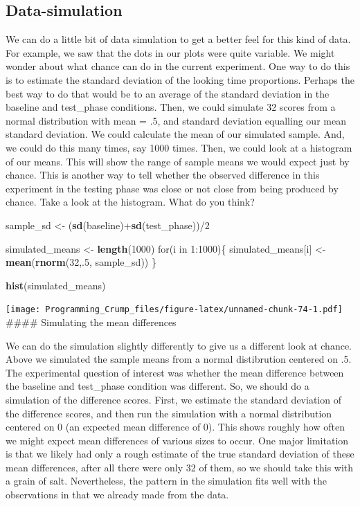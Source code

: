 \documentclass[]{book}
\newenvironment{Shaded}{\begin{snugshade}}{\end{snugshade}}
\newcommand{\KeywordTok}[1]{\textcolor[rgb]{0.13,0.29,0.53}{\textbf{{#1}}}}
\newcommand{\DecValTok}[1]{\textcolor[rgb]{0.00,0.00,0.81}{{#1}}}
\newcommand{\StringTok}[1]{\textcolor[rgb]{0.31,0.60,0.02}{{#1}}}
\newcommand{\NormalTok}[1]{{#1}}
\theoremstyle{definition}
\theoremstyle{definition}
\theoremstyle{definition}
\theoremstyle{remark}
\begin{document}
\subsection{Data-simulation}\label{data-simulation}

We can do a little bit of data simulation to get a better feel for this
kind of data. For example, we saw that the dots in our plots were quite
variable. We might wonder about what chance can do in the current
experiment. One way to do this is to estimate the standard deviation of
the looking time proportions. Perhaps the best way to do that would be
to an average of the standard deviation in the baseline and test\_phase
conditions. Then, we could simulate 32 scores from a normal distribution
with mean = .5, and standard deviation equalling our mean standard
deviation. We could calculate the mean of our simulated sample. And, we
could do this many times, say 1000 times. Then, we could look at a
histogram of our means. This will show the range of sample means we
would expect just by chance. This is another way to tell whether the
observed difference in this experiment in the testing phase was close or
not close from being produced by chance. Take a look at the histogram.
What do you think?

\begin{Shaded}
\begin{Highlighting}[]
\NormalTok{sample_sd   <-}\StringTok{ }\NormalTok{(}\KeywordTok{sd}\NormalTok{(baseline)+}\KeywordTok{sd}\NormalTok{(test_phase))/}\DecValTok{2}

\NormalTok{simulated_means <-}\StringTok{ }\KeywordTok{length}\NormalTok{(}\DecValTok{1000}\NormalTok{)}
\NormalTok{for(i in }\DecValTok{1}\NormalTok{:}\DecValTok{1000}\NormalTok{)\{}
 \NormalTok{simulated_means[i] <-}\StringTok{ }\KeywordTok{mean}\NormalTok{(}\KeywordTok{rnorm}\NormalTok{(}\DecValTok{32}\NormalTok{,.}\DecValTok{5}\NormalTok{, sample_sd))}
\NormalTok{\}}

\KeywordTok{hist}\NormalTok{(simulated_means)}
\end{Highlighting}
\end{Shaded}

\texttt{[image: Programming\_Crump\_files/figure-latex/unnamed-chunk-74-1.pdf]}
\#\#\#\# Simulating the mean differences

We can do the simulation slightly differently to give us a different
look at chance. Above we simulated the sample means from a normal
distibrution centered on .5. The experimental question of interest was
whether the mean difference between the baseline and test\_phase
condition was different. So, we should do a simulation of the difference
scores. First, we estimate the standard deviation of the difference
scores, and then run the simulation with a normal distribution centered
on 0 (an expected mean difference of 0). This shows roughly how often we
might expect mean differences of various sizes to occur. One major
limitation is that we likely had only a rough estimate of the true
standard deviation of these mean differences, after all there were only
32 of them, so we should take this with a grain of salt. Nevertheless,
the pattern in the simulation fits well with the observations in that we
already made from the data.
\end{document}
